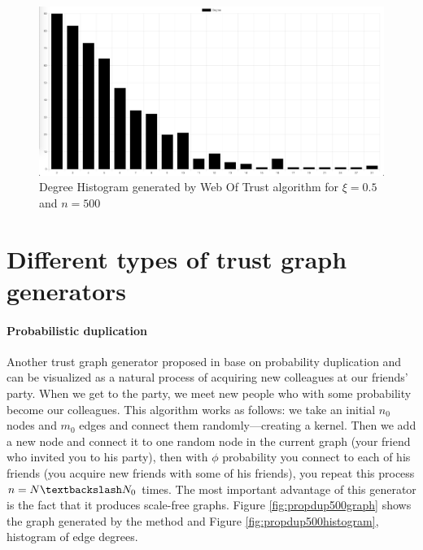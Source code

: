 \begin{figure}[h!]
    \includegraphics[width=\textwidth]{img/webOfTrust500Hist.png}
    \centering
    \caption{Degree Histogram generated by Web Of Trust algorithm for $\xi=0.5$ and $n = 500$}
    \label{fig:trustgraph500histogram}
\end{figure} 

\section{Different types of trust graph generators}

\paragraph{Probabilistic duplication}
Another trust graph generator proposed in \cite{konorski2019mitigating} base on probability duplication and can be visualized as a natural process of acquiring new colleagues at our friends' party. When we get to the party, we meet new people who with some probability become our colleagues. This algorithm works as follows: we take an initial $n_0$ nodes and $m_0$ edges and connect them randomly––creating a kernel. Then we add a new node and connect it to one random node in the current graph (your friend who invited you to his party), then with $\phi$ probability you connect to each of his friends (you acquire new friends with some of his friends), you repeat this process $n = N \textbackslash N_0$ times. 
The most important advantage of this generator is the fact that it produces scale-free graphs. Figure \ref{fig:propdup500graph} shows the graph generated by the method and Figure \ref{fig:propdup500histogram}, histogram of edge degrees.

